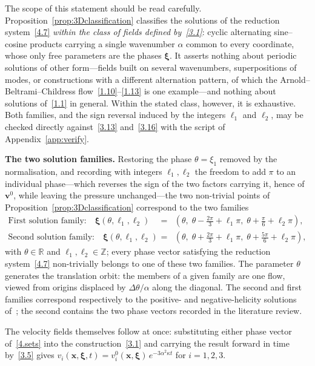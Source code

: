 \documentclass[11pt]{jfm}
\numberwithin{equation}{section}
\begin{document}
\medskip
The scope of this statement should be read carefully. Proposition~\ref{prop:3Dclassification}
classifies the solutions of the reduction system~\eqref{4.7} \emph{within the class of fields
defined by~\eqref{3.1}}: cyclic alternating sine--cosine products carrying a single wavenumber
$\alpha$ common to every coordinate, whose only free parameters are the phases $\boldsymbol{\xi}$.
It asserts nothing about periodic solutions of other form---fields built on several wavenumbers,
superpositions of modes, or constructions with a different alternation pattern, of which the
Arnold--Beltrami--Childress flow~\eqref{1.10}--\eqref{1.13} is one example---and nothing about
solutions of~\eqref{1.1} in general. Within the stated class, however, it is exhaustive. Both
families, and the sign reversal induced by the integers $\ell_1$ and $\ell_2$, may be checked
directly against~\eqref{3.13} and~\eqref{3.16} with the script of Appendix~\ref{app:verify}.

\medskip
\noindent\textbf{The two solution families.} Restoring the phase $\theta=\xi_1$ removed by the
normalisation, and recording with integers $\ell_1,\ell_2$ the freedom to add $\pi$ to an
individual phase---which reverses the sign of the two factors carrying it, hence of
$\boldsymbol{v}^0$, while leaving the pressure unchanged---the two non-trivial points of
Proposition~\ref{prop:3Dclassification} correspond to the two families
\begin{eqnarray}
\label{4.sets}
\text{First solution family:}\quad
\boldsymbol{\xi}(\theta,\ell_1,\ell_2)&=&
\left(\theta,\;\theta-\frac{2\pi}{3}+\ell_1\pi,\;\theta+\frac{\pi}{6}+\ell_2\pi\right),
\nonumber\\
\text{Second solution family:}\quad
\boldsymbol{\xi}(\theta,\ell_1,\ell_2)&=&
\left(\theta,\;\theta+\frac{2\pi}{3}+\ell_1\pi,\;\theta+\frac{5\pi}{6}+\ell_2\pi\right),
\end{eqnarray}
with $\theta\in\mathbb{R}$ and $\ell_1,\ell_2\in\mathbb{Z}$; every phase vector
satisfying the reduction system~\eqref{4.7} non-trivially belongs to one of these two families. The parameter
$\theta$ generates the translation orbit: the members of a given family are one flow, viewed from
origins displaced by $\Delta\theta/\alpha$ along the diagonal. The second and first families correspond respectively to the positive- and negative-helicity
solutions of~\citet{ant}; the second contains the two phase vectors recorded in the literature
review.

\medskip
\noindent The velocity fields themselves follow at once: substituting either phase vector
of~\eqref{4.sets} into the construction~\eqref{3.1} and carrying the result forward in time
by~\eqref{3.5} gives $v_i(\boldsymbol{x},\boldsymbol{\xi},t)=v_i^0(\boldsymbol{x},
\boldsymbol{\xi})\,e^{-3\alpha^2\kappa t}$ for $i=1,2,3$.
\end{document}
